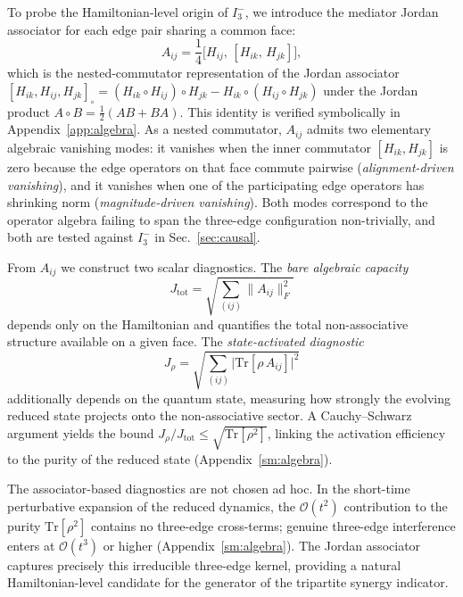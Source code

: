 \documentclass[aps,physrev,preprint,groupedaddress]{revtex4-2}
\begin{document}
To probe the Hamiltonian-level origin of $I_3^-$, we introduce the mediator Jordan associator for each edge pair sharing a common face:
\begin{equation}\label{eq:assoc}
    A_{ij} = \frac{1}{4}\big[H_{ij},\,[H_{ik},\,H_{jk}]\big],
\end{equation}
which is the nested-commutator representation of the Jordan associator $[H_{ik}, H_{ij}, H_{jk}]_\circ = (H_{ik}\circ H_{ij})\circ H_{jk} - H_{ik}\circ(H_{ij}\circ H_{jk})$ under the Jordan product $A \circ B = \tfrac{1}{2}(AB+BA)$. This identity is verified symbolically in Appendix~\ref{app:algebra}. As a nested commutator, $A_{ij}$ admits two elementary algebraic vanishing modes: it vanishes when the inner commutator $[H_{ik}, H_{jk}]$ is zero because the edge operators on that face commute pairwise (\emph{alignment-driven vanishing}), and it vanishes when one of the participating edge operators has shrinking norm (\emph{magnitude-driven vanishing}). Both modes correspond to the operator algebra failing to span the three-edge configuration non-trivially, and both are tested against $I_3^-$ in Sec.~\ref{sec:causal}.

From $A_{ij}$ we construct two scalar diagnostics.
The \emph{bare algebraic capacity}
\begin{equation}
    J_{\mathrm{tot}} = \sqrt{\textstyle\sum_{(ij)} \|A_{ij}\|_F^2}
\end{equation}
depends only on the Hamiltonian and quantifies the total non-associative structure available on a given face.
The \emph{state-activated diagnostic}
\begin{equation}
    J_\rho = \sqrt{\textstyle\sum_{(ij)} \big|\mathrm{Tr}[\rho\,A_{ij}]\big|^2}
\end{equation}
additionally depends on the quantum state, measuring how strongly the evolving reduced state projects onto the non-associative sector.
A Cauchy--Schwarz argument yields the bound $J_\rho / J_{\mathrm{tot}} \leq \sqrt{\mathrm{Tr}[\rho^2]}$, linking the activation efficiency to the purity of the reduced state (Appendix~\ref{sm:algebra}).

The associator-based diagnostics are not chosen ad hoc. In the short-time perturbative expansion of the reduced dynamics, the $\mathcal{O}(t^2)$ contribution to the purity $\mathrm{Tr}[\rho^2]$ contains no three-edge cross-terms; genuine three-edge interference enters at $\mathcal{O}(t^3)$ or higher (Appendix~\ref{sm:algebra}). The Jordan associator captures precisely this irreducible three-edge kernel, providing a natural Hamiltonian-level candidate for the generator of the tripartite synergy indicator.
\end{document}
